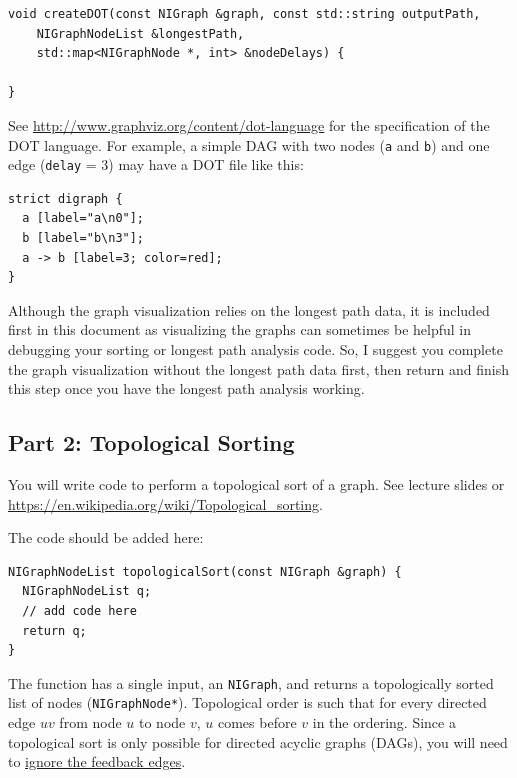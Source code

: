 \begin{lstlisting}
void createDOT(const NIGraph &graph, const std::string outputPath,
    NIGraphNodeList &longestPath,
    std::map<NIGraphNode *, int> &nodeDelays) {
  
}
\end{lstlisting}

See \url{http://www.graphviz.org/content/dot-language} for the specification of the DOT language.  For example, a simple DAG with two nodes ({\tt a} and {\tt b}) and one edge ({\tt delay} = 3) may have a DOT file like this:

\begin{lstlisting}
strict digraph {
  a [label="a\n0"];
  b [label="b\n3"];
  a -> b [label=3; color=red];  
}
\end{lstlisting}

Although the graph visualization relies on the longest path data, it is included first in this document as visualizing the graphs can sometimes be helpful in debugging your sorting or longest path analysis code.  So, I suggest you complete the graph visualization without the longest path data first, then return and finish this step once you have the longest path analysis working.


\subsection{Part 2: Topological Sorting}
\label{sec:del2}
You will write code to perform a topological sort of a graph.  See lecture slides or \url{https://en.wikipedia.org/wiki/Topological_sorting}.


The code should be added here:
\begin{lstlisting}
NIGraphNodeList topologicalSort(const NIGraph &graph) {
  NIGraphNodeList q; 
  // add code here	  
  return q;
}
\end{lstlisting}
The function has a single input, an {\tt NIGraph}, and returns a topologically sorted list of nodes ({\tt NIGraphNode*}).  Topological order is such that for every directed edge $uv$ from node $u$ to node $v$, $u$ comes before $v$ in the ordering.  Since a topological sort is only possible for directed acyclic graphs (DAGs), you will need to \uline{ignore the feedback edges}.  

